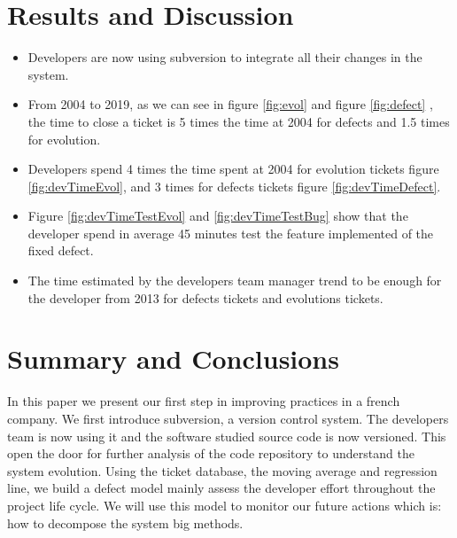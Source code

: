 \documentclass[10pt,conference]{IEEEtran}
\begin{document}
\section{Results and Discussion}\label{sec:results-discussion}
\begin{itemize}
    \item Developers are now using subversion to integrate all their changes in the system. 
    \item From 2004 to 2019, as we can see in figure \ref{fig:evol} and figure \ref{fig:defect} ,  the time to close a ticket is 5 times the time at 2004 for defects and 1.5 times for evolution.
    \item Developers spend 4 times the time spent at 2004 for evolution tickets figure \ref{fig:devTimeEvol}, and  3 times for defects tickets figure \ref{fig:devTimeDefect}.
    \item  Figure \ref{fig:devTimeTestEvol} and \ref{fig:devTimeTestBug} show that the developer spend in average 45 minutes test  the feature implemented of the fixed defect.
    \item The time estimated by the developers team manager trend to be enough for the developer from 2013 for defects tickets and evolutions tickets.
\end{itemize}

\section{Summary and Conclusions}\label{sec:conclusion}
In this paper we present our first step in  improving practices in a french company. We first introduce subversion, a version control system.
The developers team is now using it and the software studied source code is now versioned.
This open the door for further analysis of the code repository to understand the system evolution. 
Using the ticket database, the moving average and regression line, we build a defect model mainly assess the developer effort throughout the project life cycle. We will use this model to monitor our future actions which is: how to decompose the system big methods.

%


\vspace{12pt}
\end{document}
